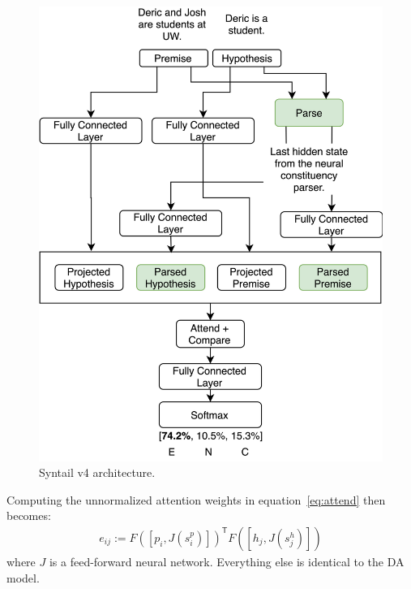 \documentclass[11pt,a4paper]{article}
\newcommand{\jbcomment}[1]{\textcolor{orange}{[#1 --josh]}}
\begin{document}
\begin{figure}[h]
    \centering
    \includegraphics[width=\linewidth]{figures/v4.png}
    \caption{Syntail v4 architecture.}
\label{fig:v4}
\end{figure}

Computing the unnormalized attention weights in equation~\ref{eq:attend} then becomes:
\begin{align}
    e_{ij} := F([p_i, J(s^p_i)])^\mathsf{T} F([h_j, J(s^h_j)])
\end{align}
where $J$ is a feed-forward neural network.
Everything else is identical to the DA model.

\end{document}
